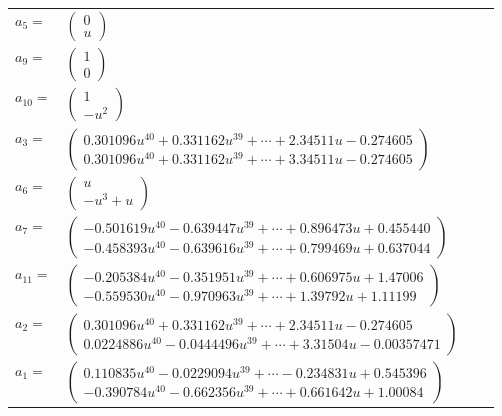 \documentclass[1p]{elsarticle_modified}
\theoremstyle{definition}
\begin{document}
\begin{tabular}{m{7pt} m{180pt} m{7pt} m{180pt} }
\flushright $a_{5}=$&$\begin{pmatrix}0\\u\end{pmatrix}$ \\
\flushright $a_{9}=$&$\begin{pmatrix}1\\0\end{pmatrix}$ \\
\flushright $a_{10}=$&$\begin{pmatrix}1\\- u^2\end{pmatrix}$ \\
\flushright $a_{3}=$&$\begin{pmatrix}0.301096 u^{40}+0.331162 u^{39}+\cdots+2.34511 u-0.274605\\0.301096 u^{40}+0.331162 u^{39}+\cdots+3.34511 u-0.274605\end{pmatrix}$ \\
\flushright $a_{6}=$&$\begin{pmatrix}u\\- u^3+u\end{pmatrix}$ \\
\flushright $a_{7}=$&$\begin{pmatrix}-0.501619 u^{40}-0.639447 u^{39}+\cdots+0.896473 u+0.455440\\-0.458393 u^{40}-0.639616 u^{39}+\cdots+0.799469 u+0.637044\end{pmatrix}$ \\
\flushright $a_{11}=$&$\begin{pmatrix}-0.205384 u^{40}-0.351951 u^{39}+\cdots+0.606975 u+1.47006\\-0.559530 u^{40}-0.970963 u^{39}+\cdots+1.39792 u+1.11199\end{pmatrix}$ \\
\flushright $a_{2}=$&$\begin{pmatrix}0.301096 u^{40}+0.331162 u^{39}+\cdots+2.34511 u-0.274605\\0.0224886 u^{40}-0.0444496 u^{39}+\cdots+3.31504 u-0.00357471\end{pmatrix}$ \\
\flushright $a_{1}=$&$\begin{pmatrix}0.110835 u^{40}-0.0229094 u^{39}+\cdots-0.234831 u+0.545396\\-0.390784 u^{40}-0.662356 u^{39}+\cdots+0.661642 u+1.00084\end{pmatrix}$ \\

\end{tabular}
\end{document}
